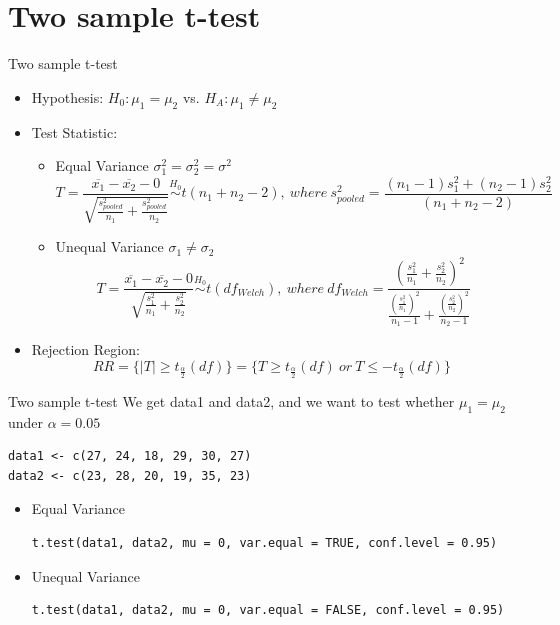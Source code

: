\documentclass[aspectratio=169]{beamer}
\begin{document}
\section{Two sample t-test}
\begin{frame}{Two sample t-test}
\begin{itemize}
    \item Hypothesis: $H_0: \mu_1 = \mu_2$ vs. $H_A: \mu_1 \neq \mu_2$
    \item Test Statistic:
    \begin{itemize}
        \item Equal Variance $\sigma_1^2 = \sigma_2^2 = \sigma^2$
    \[
    T = \frac{\overline{x_1}-\overline{x_2}-0}{\sqrt{\frac{s_{pooled}^2}{n_1}+\frac{s_{pooled}^2}{n_2}}} \overset{H_0}{\sim} t(n_1+n_2-2), \ where\ s_{pooled}^2 = \frac{(n_1-1)s_1^2+(n_2-1)s_2^2}{(n_1+n_2-2)}
    \]
        \item Unequal Variance $\sigma_1 \neq \sigma_2$
    \[
    T = \frac{\overline{x_1}-\overline{x_2}-0}{\sqrt{\frac{s_{1}^2}{n_1}+\frac{s_{2}^2}{n_2}}} \overset{H_0}{\sim} t(df_{Welch}), \ where\ df_{Welch} = \frac{(\frac{s_1^2}{n_1}+\frac{s_2^2}{n_2})^2}{\frac{(\frac{s_1^2}{n_1})^2}{n_1-1}+ \frac{(\frac{s_2^2}{n_2})^2}{n_2-1}}
    \]
        \end{itemize}
    \item Rejection Region:
    \[
    RR = \{\lvert T \rvert \ge t_{\frac{\alpha}{2}}(df)\} = \{T \ge t_{\frac{\alpha}{2}}(df)\ or\ T \le -t_{\frac{\alpha}{2}}(df)\}
    \]
\end{itemize}

\end{frame}

\begin{frame}[fragile]{Two sample t-test}
We get data1 and data2, and we want to test whether $\mu_1 = \mu_2$ under $\alpha=0.05$
\begin{lstlisting}
data1 <- c(27, 24, 18, 29, 30, 27)
data2 <- c(23, 28, 20, 19, 35, 23)
\end{lstlisting}
\begin{itemize}
    \item Equal Variance
\begin{lstlisting}
t.test(data1, data2, mu = 0, var.equal = TRUE, conf.level = 0.95)    
\end{lstlisting}

    \item Unequal Variance
\begin{lstlisting}
t.test(data1, data2, mu = 0, var.equal = FALSE, conf.level = 0.95)    
\end{lstlisting}
\end{itemize}
\end{frame}
\end{document}
